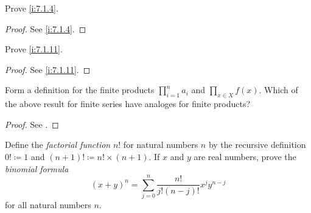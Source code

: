 \exercisesection

\begin{ex}\label{i:ex:7.1.1}
  Prove \cref{i:7.1.4}.
\end{ex}

\begin{proof}
  See \cref{i:7.1.4}.
\end{proof}

\begin{ex}\label{i:ex:7.1.2}
  Prove \cref{i:7.1.11}.
\end{ex}

\begin{proof}
  See \cref{i:7.1.11}.
\end{proof}

\begin{ex}\label{i:ex:7.1.3}
  Form a definition for the finite products \(\prod_{i = 1}^n a_i\) and \(\prod_{x \in X} f(x)\).
  Which of the above result for finite series have analoges for finite products?
\end{ex}

\begin{proof}
  See .
\end{proof}

\begin{ex}\label{i:ex:7.1.4}
  Define the \emph{factorial function} \(n!\) for natural numbers \(n\) by the recursive definition \(0! \coloneqq 1\) and \((n + 1)! \coloneqq n! \times (n + 1)\).
  If \(x\) and \(y\) are real numbers, prove the \emph{binomial formula}
  \[
    (x + y)^n = \sum_{j = 0}^n \dfrac{n!}{j!(n - j)!} x^j y^{n - j}
  \]
  for all natural numbers \(n\).
\end{ex}

